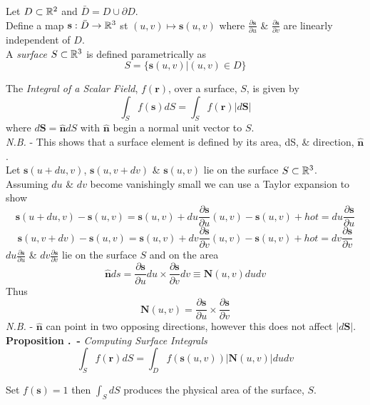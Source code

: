 \documentclass[11pt,a4paper]{article}
\begin{document}
Let $D\subset\mathbb{R}^2$ and $\bar{D}=D\cup\partial D$.\\
Define a map $\textbf{s} : \bar{D}\to\mathbb{R}^3$ st $(u,v)\mapsto\textbf{s}(u,v)$ where $\frac{\partial\textbf{s}}{\partial u}$ \& $\frac{\partial\textbf{s}}{\partial v}$ are linearly independent of $D$.\\
A \textit{surface} $S\subset\mathbb{R}^3$ is defined parametrically as
$$S=\{\textbf{s}(u,v)|(u,v)\in D\}$$

The \textit{Integral of a Scalar Field}, $f(\textbf{r})$, over a surface, $S$, is given by
$$\int_Sf(\textbf{s})dS=\int_Sf(\textbf{r})|d\textbf{S}|$$
where $d\textbf{S}=\hat{\textbf{n}}dS$ with $\hat{\textbf{n}}$ begin a normal unit vector to $S$.\\
\textit{N.B.} - This shows that a surface element is defined by its area, dS, \& direction, $\hat{\textbf{n}}$.\\

Let $\textbf{s}(u+du,v)$, $\textbf{s}(u,v+dv)$ \& $\textbf{s}(u,v)$ lie on the surface $S\subset\mathbb{R}^3$.\\
Assuming $du$ \& $dv$ become vanishingly small we can use a Taylor expansion to show
$$\textbf{s}(u+du,v)-\textbf{s}(u,v)=\textbf{s}(u,v)+du\frac{\partial\textbf{s}}{\partial u}(u,v)-\textbf{s}(u,v)+hot=du\frac{\partial\textbf{s}}{\partial u}$$
$$\textbf{s}(u,v+dv)-\textbf{s}(u,v)=\textbf{s}(u,v)+dv\frac{\partial\textbf{s}}{\partial v}(u,v)-\textbf{s}(u,v)+hot=dv\frac{\partial\textbf{s}}{\partial v}$$
$du\frac{\partial\textbf{s}}{\partial u}$ \& $dv\frac{\partial\textbf{s}}{\partial v}$ lie on the surface $S$ and on the area
$$\hat{\textbf{n}}ds=\frac{\partial\textbf{s}}{\partial u}du\times\frac{\partial\textbf{s}}{\partial v}dv\equiv\textbf{N}(u,v)dudv$$
Thus
$$\textbf{N}(u,v)=\frac{\partial\textbf{s}}{\partial u}\times\frac{\partial\textbf{s}}{\partial v}$$
\textit{N.B.} - $\hat{\textbf{n}}$ can point in two opposing directions, however this does not affect $|d\textbf{S}|$.\\

 \textbf{Proposition .\ - }\textit{Computing Surface Integrals}
$$\int_Sf(\textbf{r})dS=\int_Df(\textbf{s}(u,v))|\textbf{N}(u,v)|dudv$$

Set $f(\textbf{s})=1$ then $\displaystyle{\int_SdS}$ produces the physical area of the surface, $S$.\\
\end{document}
